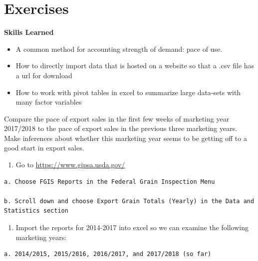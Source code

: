 \documentclass[
  letterpaper,
  DIV=11,
  numbers=noendperiod]{scrreprt}
\providecommand{\tightlist}{%
  \setlength{\itemsep}{0pt}\setlength{\parskip}{0pt}}\usepackage{longtable,booktabs,array}
\begin{document}
\section{Exercises}\label{exercises-3}

\textbf{Skills Learned}

\begin{itemize}
\item
  A common method for accounting strength of demand: pace of use.
\item
  How to directly import data that is hosted on a website so that a .csv
  file has a url for download
\item
  How to work with pivot tables in excel to summarize large data-sets
  with many factor variables
\end{itemize}

Compare the pace of export sales in the first few weeks of marketing
year 2017/2018 to the pace of export sales in the previous three
marketing years. Make inferences about whether this marketing year seems
to be getting off to a good start in export sales.

\begin{enumerate}
\def\labelenumi{\arabic{enumi}.}
\tightlist
\item
  Go to \url{https://www.gipsa.usda.gov/}
\end{enumerate}

\begin{verbatim}
a. Choose FGIS Reports in the Federal Grain Inspection Menu  

b. Scroll down and choose Export Grain Totals (Yearly) in the Data and Statistics section  
\end{verbatim}

\begin{enumerate}
\def\labelenumi{\arabic{enumi}.}
\setcounter{enumi}{1}
\tightlist
\item
  Import the reports for 2014-2017 into excel so we can examine the
  following marketing years:
\end{enumerate}

\begin{verbatim}
a. 2014/2015, 2015/2016, 2016/2017, and 2017/2018 (so far)  
\end{verbatim}
\end{document}
